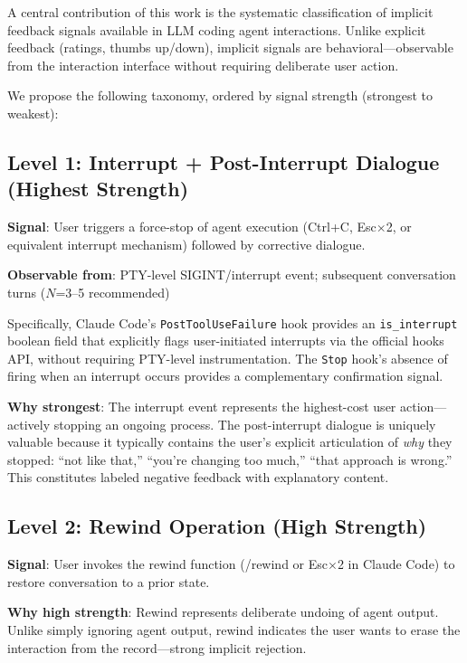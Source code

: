 \documentclass[conference]{IEEEtran}
\begin{document}
A central contribution of this work is the systematic classification of implicit feedback signals available in LLM coding agent interactions. Unlike explicit feedback (ratings, thumbs up/down), implicit signals are behavioral---observable from the interaction interface without requiring deliberate user action.

We propose the following taxonomy, ordered by signal strength (strongest to weakest):

\subsection{Level 1: Interrupt + Post-Interrupt Dialogue (Highest Strength)}

\textbf{Signal}: User triggers a force-stop of agent execution (Ctrl+C, Esc$\times$2, or equivalent interrupt mechanism) followed by corrective dialogue.

\textbf{Observable from}: PTY-level SIGINT/interrupt event; subsequent conversation turns ($N$=3--5 recommended)

Specifically, Claude Code's \texttt{PostToolUseFailure} hook provides an \texttt{is\_interrupt} boolean field that explicitly flags user-initiated interrupts via the official hooks API, without requiring PTY-level instrumentation. The \texttt{Stop} hook's absence of firing when an interrupt occurs provides a complementary confirmation signal.

\textbf{Why strongest}: The interrupt event represents the highest-cost user action---actively stopping an ongoing process. The post-interrupt dialogue is uniquely valuable because it typically contains the user's explicit articulation of \emph{why} they stopped: ``not like that,'' ``you're changing too much,'' ``that approach is wrong.'' This constitutes labeled negative feedback with explanatory content.

\subsection{Level 2: Rewind Operation (High Strength)}

\textbf{Signal}: User invokes the rewind function (/rewind or Esc$\times$2 in Claude Code) to restore conversation to a prior state.

\textbf{Why high strength}: Rewind represents deliberate undoing of agent output. Unlike simply ignoring agent output, rewind indicates the user wants to erase the interaction from the record---strong implicit rejection.
\end{document}
